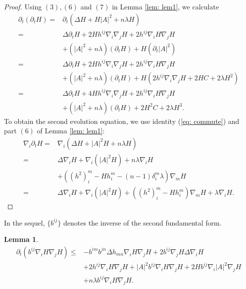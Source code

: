 \documentclass{amsart}
\newtheorem{lemma}[theorem]{Lemma}
\theoremstyle{definition}
\theoremstyle{remark}
\numberwithin{equation}{section}
\begin{document}
\begin{proof} Using $(3), (6)$ and $(7)$ in Lemma \ref{lem: lem1}, we calculate
\begin{align*}
\partial_t(\partial_tH)=&\partial_t(\Delta H+H|A|^2+n\lambda H)\\
=&\Delta \partial_tH+2Hh^{ij}\nabla_i\nabla_jH+2h^{ij}\nabla_iH\nabla_jH\\
&+ (|A|^2+n\lambda )(\partial_t H)+H(\partial_t|A|^2)\\
=&\Delta \partial_tH+2Hh^{ij}\nabla_i\nabla_jH+2h^{ij}\nabla_iH\nabla_jH\\
&+ (|A|^2+n\lambda )(\partial_t H)+H(2h^{ij}\nabla_i\nabla_jH+2HC+2\lambda H^2)\\
=&\Delta \partial_tH+4Hh^{ij}\nabla_i\nabla_jH+2h^{ij}\nabla_iH\nabla_jH\\
&+(|A|^2+n\lambda )(\partial_t H)+2H^2C+2\lambda H^3.
\end{align*}
To obtain the second evolution equation, we use identity (\ref{eq: commute}) and part $(6)$ of Lemma \ref{lem: lem1}:
\begin{align*}
\nabla_i\partial_tH=&\nabla_i(\Delta H+|A|^2H+n\lambda H)\\
=&\Delta\nabla_iH+\nabla_i(|A|^2H)+n\lambda \nabla_iH\\
&+((h^2)_i^m-Hh_i^m-(n-1)\delta_i^m\lambda )\nabla_mH\\
=&\Delta\nabla_iH+\nabla_i(|A|^2H)+((h^2)_i^m-Hh_i^m)\nabla_mH+\lambda \nabla_iH.
\end{align*}
\end{proof}
In the sequel, $\{b^{ij}\}$ denotes the inverse of the second fundamental form.
\begin{lemma}\label{lem: lem 3}
\begin{align*}
\partial_t( b^{ij}\nabla_iH\nabla_jH)\leq&-b^{im}b^{jn}\Delta h_{mn}\nabla_iH\nabla_jH+2b^{ij}\nabla_jH\Delta\nabla_iH\\
&+2h^{ij}\nabla_iH\nabla_jH
+|A|^2b^{ij}\nabla_iH\nabla_jH+2Hb^{ij}\nabla_i|A|^2\nabla_jH\\
&+n\lambda b^{ij}\nabla_iH\nabla_jH.
\end{align*}
\end{lemma}
\end{document}
